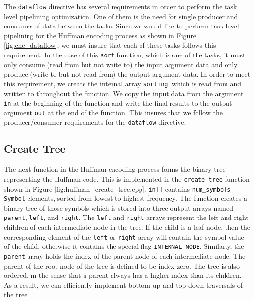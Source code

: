 \begin{aside}
The \lstinline{dataflow} directive has several requirements in order to perform the task level pipelining optimization. One of them is the need for single producer and consumer of data between the tasks. Since we would like to perform task level pipelining for the Huffman encoding process as shown in Figure \ref{fig:che_dataflow}, we must insure that each of these tasks follows this requirement. In the case of this \lstinline{sort} function, which is one of the tasks, it must only consume (read from but not write to) the input argument data and only produce (write to but not read from) the output argument data. In order to meet this requirement, we create the internal array \lstinline{sorting}, which is read from and written to throughout the function. We copy the input data from the argument \lstinline{in} at the beginning of the function and write the final results to the output argument \lstinline{out} at the end of the function. This insures that we follow the producer/consumer requirements for the \lstinline{dataflow} directive.
\end{aside}

\subsection{Create Tree}
The next function in the Huffman encoding process forms the binary tree representing the Huffman code. This is implemented in the \lstinline{create_tree} function shown in Figure \ref{fig:huffman_create_tree.cpp}. \lstinline{in[]} contains \lstinline{num_symbols} \lstinline{Symbol} elements, sorted from lowest to highest frequency. The function creates a binary tree of those symbols which is stored into three output arrays named \lstinline{parent}, \lstinline{left}, and \lstinline{right}.  The \lstinline{left} and \lstinline{right} arrays represent the left and right children of each intermediate node in the tree.  If the child is a leaf node, then the corresponding element of the \lstinline{left} or \lstinline{right} array will contain the symbol value of the child, otherwise it contains the special flag \lstinline{INTERNAL_NODE}.   Similarly, the \lstinline{parent} array holds the index of the parent node of each intermediate node.  The parent of the root node of the tree is defined to be index zero.  The tree is also ordered, in the sense that a parent  always has a higher index than its children.  As a result, we can efficiently implement bottom-up and top-down traversals of the tree. 

